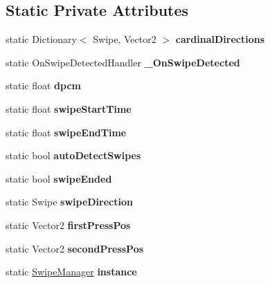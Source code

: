 \subsection*{Static Private Attributes}
\begin{DoxyCompactItemize}
\item 
static Dictionary$<$ Swipe, Vector2 $>$ {\bfseries cardinal\+Directions}
\item 
\mbox{\label{class_swipe_manager_a4af8b31879fa242abf79be1ee5c05dbf}} 
static On\+Swipe\+Detected\+Handler {\bfseries \+\_\+\+On\+Swipe\+Detected}
\item 
\mbox{\label{class_swipe_manager_a0fbeff49cfb4ec957cf800148aeed52e}} 
static float {\bfseries dpcm}
\item 
\mbox{\label{class_swipe_manager_a86798141e99e514bf033864c462f0782}} 
static float {\bfseries swipe\+Start\+Time}
\item 
\mbox{\label{class_swipe_manager_a1586ae6da77f1c184aff633510f9bafd}} 
static float {\bfseries swipe\+End\+Time}
\item 
\mbox{\label{class_swipe_manager_aa578483b62432e177583367459ef6bfa}} 
static bool {\bfseries auto\+Detect\+Swipes}
\item 
\mbox{\label{class_swipe_manager_a8416faf936a2cef35c19d5014ed36e79}} 
static bool {\bfseries swipe\+Ended}
\item 
\mbox{\label{class_swipe_manager_afe429cdd931eaba6a404df7468b39685}} 
static Swipe {\bfseries swipe\+Direction}
\item 
\mbox{\label{class_swipe_manager_a010278d06c008cdfc7f5cc62c941b144}} 
static Vector2 {\bfseries first\+Press\+Pos}
\item 
\mbox{\label{class_swipe_manager_a42f7b5999b102be423ee7a0b42afbe69}} 
static Vector2 {\bfseries second\+Press\+Pos}
\item 
\mbox{\label{class_swipe_manager_a2a8bbd10a2200887c9bade496b8d9252}} 
static \mbox{\hyperlink{class_swipe_manager}{Swipe\+Manager}} {\bfseries instance}
\end{DoxyCompactItemize}


